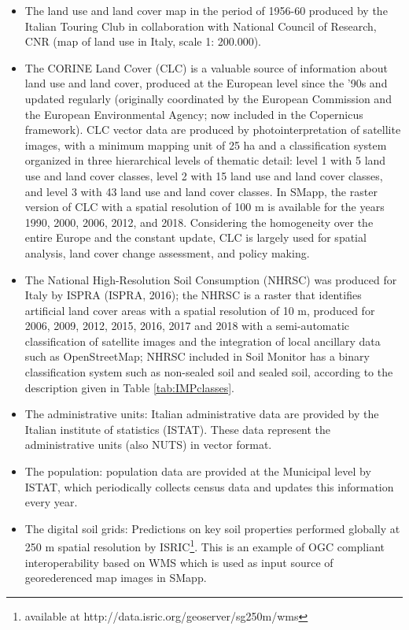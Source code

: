 \documentclass[APA,LATO1COL,doublespace]{WileyNJD-v2}
\begin{document}
\begin{itemize}
    \item The land use and land cover map in the period of 1956-60 produced by the Italian Touring Club in collaboration with National Council of Research, CNR (map of land use in Italy, scale 1: 200.000).
    \item The CORINE Land Cover (CLC) is a valuable source of information about land use and land cover, produced at the European level since the '90s and updated regularly (originally coordinated by the European Commission and the European Environmental Agency; now included in the Copernicus framework).
    CLC vector data are produced by photointerpretation of satellite images, with a minimum mapping unit of 25 ha and a classification system organized in three hierarchical levels of thematic detail: level 1 with 5 land use and land cover classes, level 2 with 15 land use and land cover classes, and level 3 with 43 land use and land cover classes. 
    In SMapp, the raster version of CLC with a spatial resolution of 100 m is available for the years 1990, 2000, 2006, 2012, and 2018. Considering the homogeneity over the entire Europe and the constant update, CLC is largely used for spatial analysis, land cover change assessment, and policy making.
    \item The National High-Resolution Soil Consumption (NHRSC) was produced for Italy by ISPRA (ISPRA, 2016); the NHRSC is a raster that identifies artificial land cover areas with a spatial resolution of 10 m, produced for 2006, 2009, 2012, 2015, 2016, 2017 and 2018 with a semi-automatic classification of satellite images and the integration of local ancillary data such as OpenStreetMap; NHRSC included in Soil Monitor has a binary classification system such as non-sealed soil and sealed soil, according to the description given in Table \ref{tab:IMPclasses}.
    \item The administrative units: Italian administrative data are provided by the Italian institute of statistics (ISTAT). 
    These data represent the administrative units (also NUTS) in vector format.
    \item The population: population data are provided at the Municipal level by ISTAT, which periodically collects census data and updates this information every year. 
    \item The digital soil grids: Predictions on key soil properties performed globally at 250 m spatial resolution by ISRIC\footnote{available at http://data.isric.org/geoserver/sg250m/wms}. This is an example of OGC compliant interoperability based on WMS which is used as input source of georederenced map images in SMapp.
\end{itemize}
\end{document}
